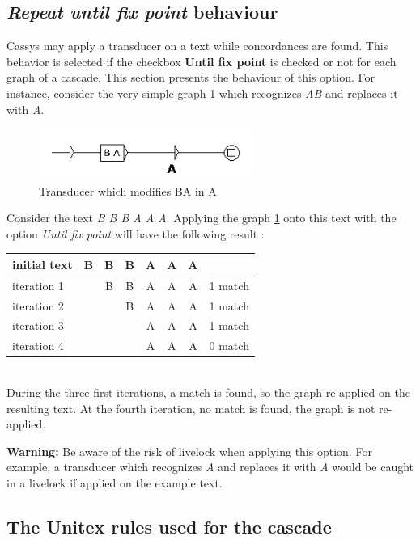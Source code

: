 \subsection{\textit{Repeat until fix point} behaviour}
\label{sub:AppWhiCon}

Cassys may apply a transducer on a text while concordances are found. This behavior is selected if the checkbox \textbf{Until fix point} is checked or not for each graph of a cascade.
This section presents the behaviour of this option.
\bigskip
For instance, consider the very simple graph \ref{fig:AB->A} which recognizes \emph{AB} and
replaces it with \emph{A}. 

\begin{figure}[!htb]
  \centering
  \includegraphics[width=7cm]{resources/img/AB_to_A.png}
  \caption{Transducer which modifies BA in A}
  \label{fig:AB->A}
\end{figure}

Consider the text \emph{B B B A A A}. Applying the graph \ref{fig:AB->A} onto this text with the option \emph{Until fix point} will have the following result :\\

\begin{tabular}{|l|cccccc|r|}
\hline
initial text  &B&B&B&A&A&A&\\
\hline
iteration 1 & &B&B&A&A&A& 1 match\\
iteration 2 & & &B&A&A&A& 1 match\\
iteration 3 & & & &A&A&A& 1 match\\
iteration 4 & & & &A&A&A& 0 match\\
\hline
\end{tabular} \\

During the three first iterations, a match is found, so the graph
re-applied on the resulting text. At the fourth iteration, no match is
found, the graph is not re-applied.

\large{\textbf{Warning:}} Be aware of the risk of livelock when applying this
option. For example, a transducer which recognizes \emph{A} and replaces it with
\emph{A} would be caught in a livelock if applied on the example text.

\subsection{The Unitex rules used for the cascade}

